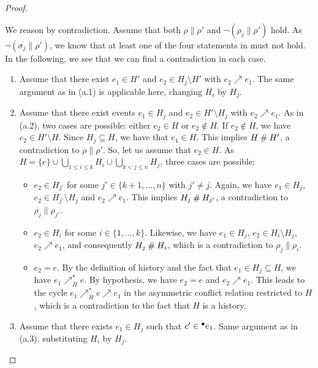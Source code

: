 \documentclass[12pt,a4paper]{article}
\newcommand{\confl}{\ensuremath\mathbin\#}
\begin{document}
\begin{proof}
\begin{enumerate}[(a)]
We reason by contradiction.  Assume that both $\rho \parallel \rho'$ and $\lnot
(\rho_j \parallel \rho')$ hold.  As $\lnot (\sigma_j \parallel \rho')$, we know
that at least one of the four statements in  must not hold.
In the following, we see that we can find a contradiction in each case.

\begin{enumerate}[1.]
\item Assume that there exist $e_1 \in H'$ and $e_2 \in H_j \setminus H'$ with
$e_2 \nearrow e_1$.  The same argument as in (a.1) is applicable here, changing
$H_i$ by $H_j$.

\item Assume that there exist events $e_1 \in H_j$ and $e_2 \in H' \setminus
H_j$ with $e_2 \nearrow e_1$.  As in (a.2), two cases are possible: either $e_2
\in H$ or $e_2 \notin H$.  If $e_2 \notin H$, we have $e_2 \in H' \setminus H$.
Since $H_j \subseteq H$, we have that $e_1 \in H$.  This implies $H \confl H'$,
a contradiction to $\rho \parallel \rho'$.  So, let us assume that $e_2 \in H$.
As $H = \{e\} \cup \bigcup_{1 \le i \le k} H_i \cup \bigcup_{k < j \le n} H_j$,
three cases are possible:

\begin{itemize}
\item $e_2 \in H_{j'}$ for some $j' \in \{k+1, \ldots, n\}$ with $j' \ne j$.
Again, we have $e_1 \in H_j$, $e_2 \in H_{j'} \setminus H_j$ and $e_2 \nearrow
e_1$.  This implies $H_j \confl H_{j'}$, a contradiction to $\rho_j \parallel
\rho_{j'}$.

\item $e_2 \in H_i$ for some $i \in \{1, \ldots, k\}$.  Likewise, we have $e_1
\in H_j$, $e_2 \in H_i \setminus H_j$, $e_2 \nearrow e_1$, and consequently
$H_j \confl H_i$, which is a contradiction to $\rho_j \parallel \rho_i$.

\item $e_2 = e$.  By the definition of history and the fact that $e_1 \in H_j
\subseteq H$, we have $e_1 \nearrow^*_H e$.  By hypothesis, we have $e_2 = e$
and $e_2 \nearrow e_1$.  This leads to the cycle $e_1 \nearrow^*_H e \nearrow
e_1$ in the asymmetric conflict relation restricted to $H$, which is a
contradiction to the fact that $H$ is a history.
\end{itemize}

\item Assume that there exists $e_1 \in H_j$ such that $c' \in {}^\bullet e_1$.
Same argument as in (a.3), substituting $H_i$ by $H_j$.


\end{enumerate}
\end{enumerate}
\end{proof}
\end{document}
